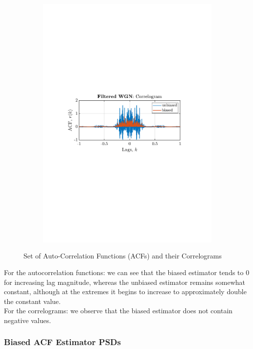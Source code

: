 \documentclass[12pt]{article}
\begin{document}
\begin{figure}[H]
\begin{subfigure}{0.49\textwidth}
			\includegraphics[trim={2.2cm 11.2cm 3.15cm  11.2cm}, clip, width=\textwidth]{../MATLAB/figures/q1_3a_fig06.pdf} 
		\end{subfigure}
		\captionsetup{justification=centering}
		\caption{Set of Auto-Correlation Functions (ACFs) and their Correlograms}
		\label{fig: 1-3a}
	\end{figure}
	
	For the autocorrelation functions: we can see that the biased estimator tends to 0 for increasing lag magnitude, whereas the unbiased estimator remains somewhat constant, although at the extremes it begins to increase to approximately double the constant value.\\
	For the correlograms: we observe that the biased estimator does not contain negative values.
	
	\subsubsection{Biased ACF Estimator PSDs}
\end{document}
